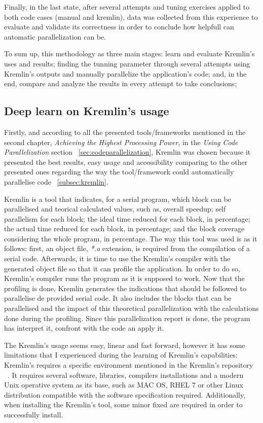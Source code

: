 Finally, in the last state, after several attempts and tuning exercises applied to both code cases (manual and kremlin), data was collected from this experience to evaluate and validate its correctness in order to conclude how helpfull can automatic parallelization can be.

To sum up, this methodology as three main stages: learn and evaluate  Kremlin's uses and results; finding the tunning parameter through several attempts using Kremlin's outputs and manually parallelize the application's code; and, in the end, compare and analyze the results in every attempt to take conclusions; 


\subsection{Deep learn on Kremlin's usage}

Firstly, and according to all the presented tools/frameworks mentioned in the second chapter, \textit{Achieving the Highest Processing Power}, in the \textit{Using Code Parallelization} section ~\ref{sec:codeparallelization}, Kremlin was chosen because it presented the best results, easy usage and accessibility comparing to the other presented ones regarding the way the tool/framework could automatically parallelise code ~\ref{subsec:kremlin}.

Kremlin is a tool that indicates, for a serial program, which block can be parallelised and teorical calculated values, such as, overall speedup; self parallelism for each block; the ideal time reduced for each block, in percentage; the actual time reduced for each block, in percentage; and the block coverage considering the whole program, in percentage. The way this tool was used is as it follows: first, an object file, \textit{*.o} extension, is required from the compilation of a serial code. Afterwards, it is time to use the Kremlin's compiler with the generated object file so that it can profile the application. In order to do so, Kremlin's compiler runs the program as it is supposed to work. Now that the profiling is done, Kremlin generates the indications that should be followed to parallelise de provided serial code. It also includes the blocks that can be parallelised and the impact of this theoretical parallelization with the calculations done during the profiling. Since this parallelization report is done, the program has interpret it, confront with the code an apply it.

The Kremlin's usage seems easy, linear and fast forward, however it has some limitations that I experienced during the learning of Kremlin's capabilities: Kremlin's requires a specific environment mentioned in the Kremlin's repository ~\cite{KremlinRep}. It requires several software, libraries, compilers installations and a modern Unix operative system as its base, such as MAC OS, RHEL 7 or other Linux distribution compatible with the software specification required. Additionally, when installing the Kremlin's tool, some minor fixed are required in order to successfully install.

